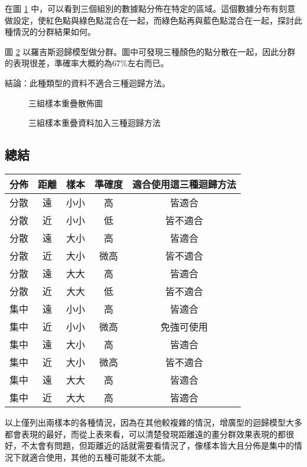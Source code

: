 \documentclass[12pt, a4paper]{article}
\begin{document}
在圖 \ref{fig:rdn18-scatter} 中，可以看到三個組別的數據點分佈在特定的區域。這個數據分布有刻意做設定，使紅色點與綠色點混合在一起，而綠色點再與藍色點混合在一起，探討此種情況的分群結果如何。

圖 \ref{fig:rdn18-LR-result} 以羅吉斯迴歸模型做分群。圖中可發現三種顏色的點分散在一起，因此分群的表現很差，準確率大概約為67\%左右而已。

結論：此種類型的資料不適合三種迴歸方法。

\begin{figure}[H]
    \caption{三組樣本重疊散佈圖}
    \label{fig:rdn18-scatter}
\end{figure}

\begin{figure}[H]
    \caption{三組樣本重疊資料加入三種迴歸方法}
    \label{fig:rdn18-LR-result}
\end{figure}
\subsection{總結}
\begin{center}
  \begin{tabular}{lcccc}
    \hline \rowcolor{magicmint}
    分佈 & 距離  & 樣本  & 準確度 & 適合使用這三種迴歸方法\\\hline\rowcolor{mistyrose}
    分散 & 遠    & 小小  & 高 & 皆適合\\\rowcolor{bubbles}
    分散 & 近    & 小小  & 低 & 皆不適合\\\rowcolor{mistyrose}
    分散 & 遠    & 大小  & 高 & 皆適合\\\rowcolor{bubbles}
    分散 & 近    & 大小  & 微高& 皆不適合\\\rowcolor{mistyrose}
    分散 & 遠    & 大大  & 高 & 皆適合\\\rowcolor{bubbles}
    分散 & 近    & 大大  & 低 & 皆不適合\\\rowcolor{mistyrose}
    集中 & 遠    & 小小  & 高 & 皆適合\\\rowcolor{bubbles}
    集中 & 近    & 小小  & 微高 & 免強可使用\\\rowcolor{mistyrose}
    集中 & 遠    & 大小  & 高 & 皆適合\\\rowcolor{bubbles}
    集中 & 近    & 大小  & 微高 & 皆不適合\\\rowcolor{mistyrose}
    集中 & 遠    & 大大  & 高 & 皆適合\\\rowcolor{bubbles}
    集中 & 近    & 大大  & 高 & 皆適合\\\hline
    \end{tabular}
\end{center}
以上僅列出兩樣本的各種情況，因為在其他較複雜的情況，增廣型的迴歸模型大多都會表現的最好，而從上表來看，可以清楚發現距離遠的畫分群效果表現的都很好，不太會有問題，但距離近的話就需要看情況了，像樣本皆大且分佈是集中的情況下就適合使用，其他的五種可能就不太能。
\end{document}
